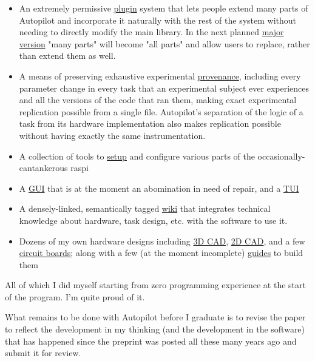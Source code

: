 \begin{done}
\begin{itemize}
\item An extremely permissive \href{https://docs.auto-pi-lot.com/en/latest/guide/plugins.html}{plugin} system that lets people extend many parts of Autopilot and incorporate it naturally with the rest of the system without needing to directly modify the main library. In the next planned \href{https://github.com/wehr-lab/autopilot/milestone/2}{major version} "many parts" will become "all parts" and allow users to replace, rather than extend them as well.
\item A means of preserving exhaustive experimental \href{https://docs.auto-pi-lot.com/en/latest/core/subject.html}{provenance}, including every parameter change in every task that an experimental subject ever experiences and all the versions of the code that ran them, making exact experimental replication possible from a single file. Autopilot's separation of the logic of a task from its hardware implementation also makes replication possible without having exactly the same instrumentation.
\item A collection of tools to \href{https://docs.auto-pi-lot.com/en/latest/setup/index.html}{setup} and configure various parts of the occasionally-cantankerous raspi
\item A \href{https://docs.auto-pi-lot.com/en/latest/core/terminal.html}{GUI} that is at the moment an abomination in need of repair, and a \href{https://docs.auto-pi-lot.com/en/latest/guide/installation.html#configuration}{TUI}
\item A densely-linked, semantically tagged \href{https://wiki.auto-pi-lot.com/index.php/Autopilot_Wiki}{wiki} that integrates technical knowledge about hardware, task design, etc. with the software to use it. 
\item Dozens of my own hardware designs including \href{https://wiki.auto-pi-lot.com/index.php/3D_CAD}{3D CAD}, \href{https://wiki.auto-pi-lot.com/index.php/2D_CAD}{2D CAD}, and a few \href{https://wiki.auto-pi-lot.com/index.php/PCBs}{circuit boards}; along with a few (at the moment incomplete) \href{https://wiki.auto-pi-lot.com/index.php/Guides}{guides} to build them
\end{itemize}

\end{done}

All of which I did myself starting from zero programming experience at the start of the program. I'm quite proud of it.

\begin{todo}
What remains to be done with Autopilot before I graduate is to revise the paper to reflect the development in my thinking (and the development in the software) that has happened since the preprint was posted all these many years ago and submit it for review. 
\end{todo}


